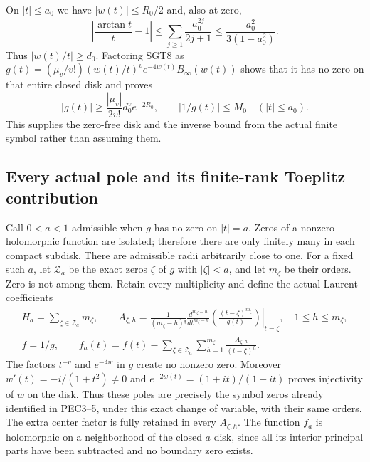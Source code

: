\documentclass[10pt]{article}
\begin{document}
On $|t|\le a_0$ we have $|w(t)|\le R_0/2$ and, also at zero,
\[
 \left|\frac{\arctan t}{t}-1\right|
 \le\sum_{j\ge1}\frac{a_0^{2j}}{2j+1}
 \le\frac{a_0^2}{3(1-a_0^2)}.
\]
Thus $|w(t)/t|\ge d_0$. Factoring SGT8 as
$g(t)=(\mu_v/v!)(w(t)/t)^ve^{-4w(t)}B_\infty(w(t))$
shows that it has no zero on that entire closed disk and proves
\[
 |g(t)|\ge \frac{|\mu_v|}{2v!}d_0^ve^{-2R_0},
 \qquad |1/g(t)|\le M_0 \quad(|t|\le a_0).
 \tag{SGT13}
\]
This supplies the zero-free disk and the inverse bound from the
actual finite symbol rather than assuming them.

\subsection{Every actual pole and its finite-rank Toeplitz contribution}

Call $0<a<1$ admissible when $g$ has no zero on $|t|=a$.
Zeros of a nonzero holomorphic function are isolated; therefore
there are only finitely many in each compact subdisk. There are
admissible radii arbitrarily close to one. For a fixed such $a$,
let $\mathcal Z_a$ be the exact zeros $\zeta$ of $g$ with $|\zeta|<a$,
and let $m_\zeta$ be their orders. Zero is not among them.
Retain every multiplicity and define the actual Laurent coefficients
\[
\begin{gathered}
 H_a=\sum_{\zeta\in\mathcal Z_a}m_\zeta,\qquad
 A_{\zeta,h}
 =\frac1{(m_\zeta-h)!}
  \left.\frac{d^{m_\zeta-h}}{dt^{m_\zeta-h}}
           \left(\frac{(t-\zeta)^{m_\zeta}}{g(t)}\right)
       \right|_{t=\zeta},\quad1\le h\le m_\zeta,\\
 f=1/g,\qquad
 f_a(t)=f(t)-\sum_{\zeta\in\mathcal Z_a}
                      \sum_{h=1}^{m_\zeta}\frac{A_{\zeta,h}}{(t-\zeta)^h}.
\end{gathered}\tag{SGT14}
\]
The factors $t^{-v}$ and $e^{-4w}$ in $g$ create no nonzero zero.
Moreover $w'(t)=-i/(1+t^2)\ne0$ and
$e^{-2w(t)}=(1+it)/(1-it)$ proves injectivity of $w$ on the disk.
Thus these poles are precisely the symbol zeros already identified in
PEC3--5, under this exact change of variable, with their same orders.
The extra center factor is fully retained in every $A_{\zeta,h}$.
The function $f_a$ is holomorphic on a neighborhood of the closed
$a$ disk, since all its interior principal parts have been subtracted
and no boundary zero exists.
\end{document}
